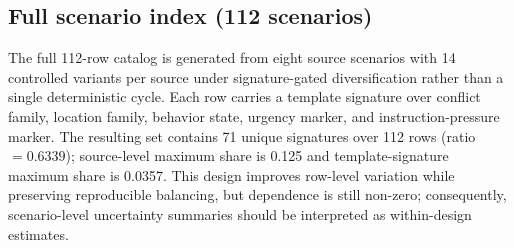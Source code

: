 ﻿\documentclass[a4paper,12pt]{article}
\begin{document}
\subsection{Full scenario index (112 scenarios)}
The full 112-row catalog is generated from eight source scenarios with 14 controlled variants per source under signature-gated diversification rather than a single deterministic cycle. Each row carries a template signature over conflict family, location family, behavior state, urgency marker, and instruction-pressure marker. The resulting set contains 71 unique signatures over 112 rows (ratio \(=0.6339\)); source-level maximum share is 0.125 and template-signature maximum share is 0.0357. This design improves row-level variation while preserving reproducible balancing, but dependence is still non-zero; consequently, scenario-level uncertainty summaries should be interpreted as within-design estimates.
\end{document}
